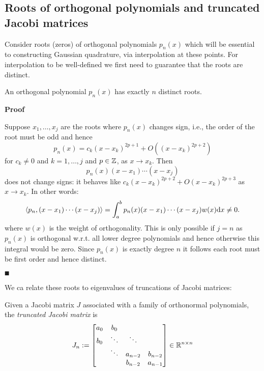 \subsection{Roots of orthogonal polynomials and truncated Jacobi matrices}
Consider roots (zeros) of orthogonal polynomials $p_n(x)$ which will be essential to constructing Gaussian quadrature, via interpolation at these points. For interpolation to be well-defined we first need to guarantee that the roots are distinct.

\begin{lemma}[OP roots] An orthogonal polynomial $p_n(x)$ has exactly $n$ distinct roots.

\end{lemma}
\textbf{Proof}

Suppose $x_1, \ensuremath{\ldots},x_j$ are the roots where $p_n(x)$ changes sign, i.e., the order of the root must be odd and hence
\[
p_n(x) = c_k (x-x_k)^{2p+1} + O((x-x_k)^{2p+2})
\]
for $c_k \ensuremath{\neq} 0$ and $k = 1,\ensuremath{\ldots},j$ and $p \in {\mathbb Z}$, as $x \ensuremath{\rightarrow} x_k$. Then
\[
p_n(x) (x-x_1) \ensuremath{\cdots}(x-x_j)
\]
does not change signs: it behaves like $c_k (x-x_k)^{2p+2} + O(x-x_k)^{2p+3}$ as $x \ensuremath{\rightarrow} x_k$. In other words:
\[
\ensuremath{\langle}p_n,(x-x_1) \ensuremath{\cdots}(x-x_j) \ensuremath{\rangle} = \int_a^b p_n(x) (x-x_1) \ensuremath{\cdots}(x-x_j) w(x) {\rm d} x \ensuremath{\neq} 0.
\]
where $w(x)$ is the weight of orthogonality. This is only possible if $j = n$ as $p_n(x)$ is orthogonal w.r.t. all lower degree polynomials and hence otherwise this integral would be zero. Since $p_n(x)$ is exactly degree $n$ it follows each root must be first order and hence distinct.

\ensuremath{\QED}

We ca relate these roots to eigenvalues of truncations of Jacobi matrices:

\begin{definition} Given a Jacobi matrix $J$ associated with a family of orthonormal polynomials,  the \emph{truncated Jacobi matrix} is
\[
J_n := \begin{bmatrix} a_0 & b_0 \\
                         b_0 & \ddots & \ddots \\
                         & \ddots & a_{n-2} & b_{n-2} \\
                         && b_{n-2} & a_{n-1} \end{bmatrix} \in {\mathbb R}^{n \times n}
\]
\end{definition}

